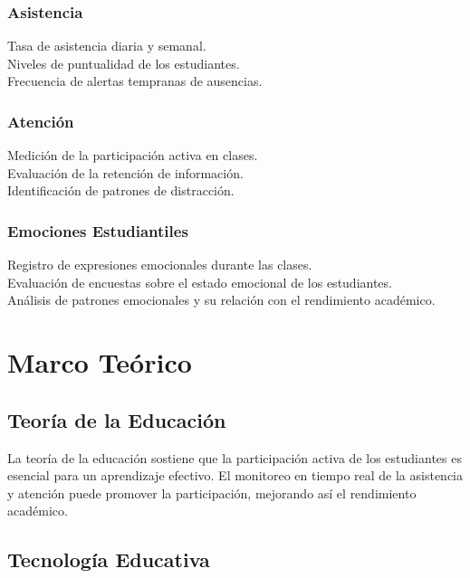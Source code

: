 \documentclass[12pt]{article}
\begin{document}
\subsubsection*{Asistencia}
Tasa de asistencia diaria y semanal.\\
Niveles de puntualidad de los estudiantes.\\
Frecuencia de alertas tempranas de ausencias.
\subsubsection*{Atención}
Medición de la participación activa en clases.\\
Evaluación de la retención de información.\\
Identificación de patrones de distracción.
\subsubsection*{Emociones Estudiantiles}
Registro de expresiones emocionales durante las clases.\\
Evaluación de encuestas sobre el estado emocional de los estudiantes.\\
Análisis de patrones emocionales y su relación con el rendimiento académico.


\section{Marco Teórico }
\subsection*{Teoría de la Educación}

La teoría de la educación sostiene que la participación activa de los estudiantes es esencial para un aprendizaje efectivo. El monitoreo en tiempo real de la asistencia y atención puede promover la participación, mejorando así el rendimiento académico.
\subsection*{Tecnología Educativa}
\end{document}
